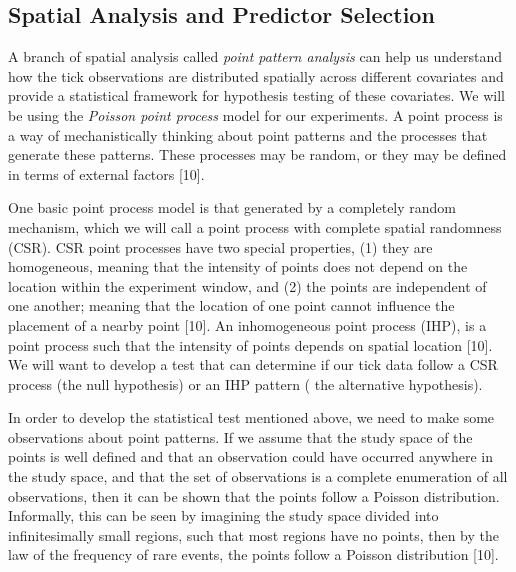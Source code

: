 \subsection{Spatial Analysis and Predictor Selection}
\noindent A branch of spatial analysis called \textit{point pattern analysis} can help us understand how the tick observations are distributed spatially across different covariates and provide a statistical framework for hypothesis testing of these covariates. We will be using the \textit{Poisson point process} model for our experiments. A point process is a way of mechanistically thinking about point patterns and the processes that generate these patterns. These processes may be random, or they may be defined in terms of external factors [10]. \newline

\noindent One basic point process model is that generated by a completely random mechanism, which we will call a point process with complete spatial randomness (CSR). CSR point processes have two special properties, (1) they are homogeneous, meaning that the intensity of points does not depend on the location within the experiment window, and (2) the points are independent of one another; meaning that the location of one point cannot influence the placement of a nearby point [10]. An inhomogeneous point process (IHP), is a point process such that the intensity of points depends on spatial location [10]. We will want to develop a test that can determine if our tick data follow a CSR process (the null hypothesis) or an IHP pattern ( the alternative hypothesis). \newline 

\noindent In order to develop the statistical test mentioned above, we need to make some observations about point patterns. If we assume that the study space of the points is well defined and that an observation could have occurred anywhere in the study space, and that the set of observations is a complete enumeration of all observations, then it can be shown that the points follow a Poisson distribution. Informally, this can be seen by imagining the study space divided into infinitesimally small regions, such that most regions have no points, then by the law of the frequency of rare events, the points follow a Poisson distribution [10].  \newline

